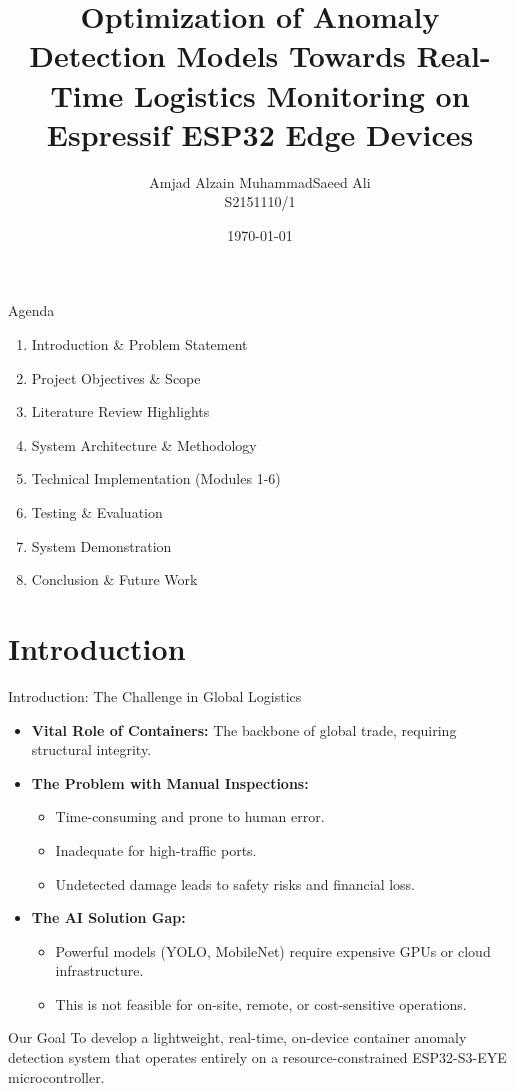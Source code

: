 \documentclass{beamer}
\title[FYP2 VIVA]{Optimization of Anomaly Detection Models Towards Real-Time Logistics Monitoring on Espressif ESP32 Edge Devices}
\author{Amjad Alzain MuhammadSaeed Ali \\ S2151110/1}
\institute{Faculty of Computer Science \& Information Technology \\ University of Malaya}
\date{\today}
\begin{document}
\begin{frame}
    \titlepage
\end{frame}

\begin{frame}{Agenda}
    \begin{enumerate}
        \item Introduction \& Problem Statement
        \item Project Objectives \& Scope
        \item Literature Review Highlights
        \item System Architecture \& Methodology
        \item Technical Implementation (Modules 1-6)
        \item Testing \& Evaluation
        \item System Demonstration
        \item Conclusion \& Future Work
    \end{enumerate}
\end{frame}

\section{Introduction}
\begin{frame}{Introduction: The Challenge in Global Logistics}
    \begin{itemize}
        \item \textbf{Vital Role of Containers:} The backbone of global trade, requiring structural integrity.
        \item \textbf{The Problem with Manual Inspections:}
        \begin{itemize}
            \item Time-consuming and prone to human error.
            \item Inadequate for high-traffic ports.
            \item Undetected damage leads to safety risks and financial loss.
        \end{itemize}
        \item \textbf{The AI Solution Gap:}
        \begin{itemize}
            \item Powerful models (YOLO, MobileNet) require expensive GPUs or cloud infrastructure.
            \item This is not feasible for on-site, remote, or cost-sensitive operations.
        \end{itemize}
    \end{itemize}
    \begin{alertblock}{Our Goal}
        To develop a lightweight, real-time, on-device container anomaly detection system that operates entirely on a resource-constrained ESP32-S3-EYE microcontroller.
    \end{alertblock}
\end{frame}
\end{document}
